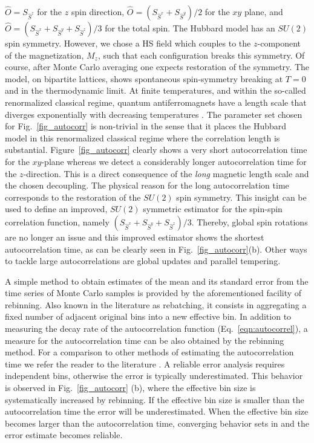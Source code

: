 $\hat{O} = S_{\hat{S}^{z}}$ for the $z$ spin direction, 
$\hat{O} =(S_{\hat{S}^{x}} + S_{\hat{S}^{y}})/2$ for the $xy$ plane, and
$\hat{O} =(S_{\hat{S}^{x}} + S_{\hat{S}^{y}}+ S_{\hat{S}^{z}})/3$ for the total spin.
The Hubbard model has an $SU(2)$ spin symmetry. However, we chose a HS field which couples to the $z$-component of the magnetization,  $M_z$,  such that each configuration breaks this symmetry. Of course, after Monte Carlo averaging one expects restoration of the symmetry. The model, on bipartite  lattices,  shows spontaneous spin-symmetry breaking at $T=0$ and in the thermodynamic limit.  At finite temperatures, and within the so-called renormalized classical regime,  quantum antiferromagnets have a length scale  that  diverges  exponentially  with decreasing temperatures \cite{Chakravarty88}.     
The parameter set chosen for Fig.~\ref{fig_autocorr}  is non-trivial in the sense that it places the Hubbard model in this renormalized classical regime where the correlation length is substantial.  Figure~\ref{fig_autocorr}  clearly shows a very short autocorrelation time for the $xy$-plane whereas we detect a considerably longer  autocorrelation time  for the $z$-direction.  This is a direct consequence of the \emph{long} magnetic length scale and the chosen decoupling.
The physical reason for the long autocorrelation time  corresponds to  the restoration of the $SU(2)$ spin symmetry.    This insight can be used to define an improved, $SU(2)$ symmetric estimator for the spin-spin correlation function, namely
$(S_{\hat{S}^{x}} + S_{\hat{S}^{y}} + S_{\hat{S}^{z}})/3$. 
Thereby, global spin rotations are no longer an issue and this improved estimator  shows the shortest autocorrelation time, as can be clearly seen in Fig.~\ref{fig_autocorr}(b). Other ways to tackle large autocorrelations are global updates and parallel tempering.

A simple method to obtain estimates of the mean and its standard error from the time series of Monte Carlo samples is provided by the aforementioned facility of rebinning. Also known in the literature as rebatching, it consists in aggregating a fixed number  of adjacent original bins into a new effective bin.
In addition to measuring the decay rate of the autocorrelation function (Eq.~\eqref{eqn:autocorrel}), a measure for the autocorrelation time  can be also obtained by the rebinning method. 
For a comparison to other methods of estimating the autocorrelation time we refer the reader to the literature \cite{Thompson2010, Geyer1992, neal1993}.
A reliable error analysis requires independent bins, otherwise the error is typically underestimated. This behavior is observed in Fig.~\ref{fig_autocorr} (b), where the effective bin size is systematically increased by rebinning. If the effective bin size is smaller than the autocorrelation time the error will be underestimated. When the effective bin size becomes  larger than the autocorrelation time, converging behavior sets in and the error estimate becomes reliable.

